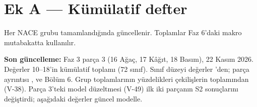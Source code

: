 \hypertarget{defter}{%
\chapter{Ek A --- Kümülatif defter}\label{defter}}

Her NACE grubu tamamlandığında güncellenir. Toplamlar Faz 6'daki makro mutabakatta kullanılır.

\textbf{Son güncelleme:} Faz 3 parça 3 (16 Ağaç, 17 Kâğıt, 18 Basım), 22 Kasım 2026. Değerler 10--18'in kümülatif toplamı (72 sınıf). Sınıf düzeyi değerler 'den; parça ayrıntısı ,  ve  Bölüm 6. Grup toplamlarının yüzdelikleri çekilişlerin toplamından (V-38). Parça 3'teki model düzeltmesi (V-49) ilk iki parçanın S2 sonuçlarını değiştirdi; aşağıdaki değerler güncel modelle.

\begingroup\gbtablo\small

